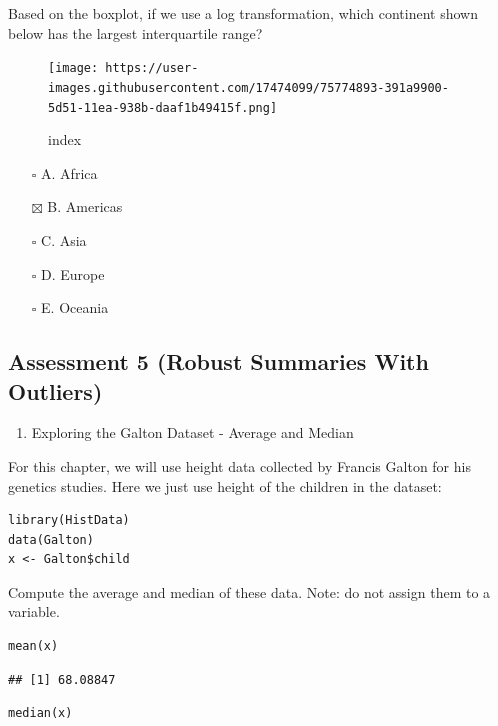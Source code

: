 \documentclass[
]{article}
\providecommand{\tightlist}{%
  \setlength{\itemsep}{0pt}\setlength{\parskip}{0pt}}
\begin{document}
Based on the boxplot, if we use a log transformation, which continent
shown below has the largest interquartile range?

\begin{figure}
\centering
\texttt{[image: https://user-images.githubusercontent.com/17474099/75774893-391a9900-5d51-11ea-938b-daaf1b49415f.png]}
\caption{index}
\end{figure}

\begin{itemize}
\tightlist
\item[$\square$]
  A. Africa
\item[$\boxtimes$]
  B. Americas
\item[$\square$]
  C. Asia
\item[$\square$]
  D. Europe
\item[$\square$]
  E. Oceania
\end{itemize}

\hypertarget{assessment-5-robust-summaries-with-outliers}{%
\subsection{Assessment 5 (Robust Summaries With
Outliers)}\label{assessment-5-robust-summaries-with-outliers}}

\begin{enumerate}
\def\labelenumi{\arabic{enumi}.}
\tightlist
\item
  Exploring the Galton Dataset - Average and Median
\end{enumerate}

For this chapter, we will use height data collected by Francis Galton
for his genetics studies. Here we just use height of the children in the
dataset:

\begin{verbatim}
library(HistData)
data(Galton)
x <- Galton$child
\end{verbatim}

Compute the average and median of these data. Note: do not assign them
to a variable.

\begin{verbatim}
mean(x)
\end{verbatim}

\begin{verbatim}
## [1] 68.08847
\end{verbatim}

\begin{verbatim}
median(x)
\end{verbatim}
\end{document}
